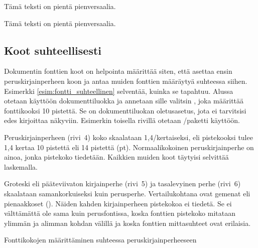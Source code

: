 \pagebreak[3]

\begin{koodilohkosis}
  \begin{footnotesize}
    \begin{scshape}
      Tämä teksti on pientä pienversaalia.
    \end{scshape}
  \end{footnotesize}
\end{koodilohkosis}

\begin{tulossis}
  \begin{footnotesize}
    \begin{scshape}
      Tämä teksti on pientä pienversaalia.
    \end{scshape}
  \end{footnotesize}
\end{tulossis}

\pagebreak[3]

\subsection{Koot suhteellisesti}
\label{luku:fontti_suhteellinen}

Dokumentin fonttien koot on helpointa määrittää siten, että asettaa
ensin peruskirjainperheen koon ja antaa muiden fonttien määräytyä
suhteessa siihen. Esimerkki \ref{esim:fontti_suhteellinen} selventää,
kuinka se tapahtuu. Alussa otetaan käyttöön dokumenttiluokka
 ja annetaan sille valitsin \koodi{10pt}, joka määrittää
fonttikooksi 10 pistettä. Se on dokumenttiluokan ole\-tus\-ase\-tus,
jota ei tarvitsisi edes kirjoittaa näkyviin. Esimerkin toisella rivillä
otetaan \-/paketti käyttöön.

Peruskirjainperheen (rivi~4) koko skaalataan 1,4\-/kertaiseksi, eli
pistekooksi tulee 1,4 kertaa 10 pistettä eli 14 pistettä (pt).
Normaalikokoinen peruskirjainperhe on ainoa, jonka pistekoko tiedetään.
Kaikkien muiden koot täytyisi selvittää laskemalla.

Groteski eli pääteviivaton kirjainperhe (rivi~5) ja tasalevyinen perhe
(rivi~6) skaalataan samankorkuiseksi kuin perusperhe. Vertailukohtana
ovat gemenat eli pienaakkoset (). Näiden kahden
kirjainperheen pistekokoa ei tiedetä. Se ei välttämättä ole sama kuin
perusfontissa, koska fonttien pistekoko mitataan ylimmän ja alimman
kohdan välillä ja koska fonttien mittasuhteet ovat erilaisia.

\begin{esimerkki*}
\caption{Fonttikokojen määrittäminen suhteessa peruskirjainperheeseen}
\label{esim:fontti_suhteellinen}
\end{esimerkki*}

